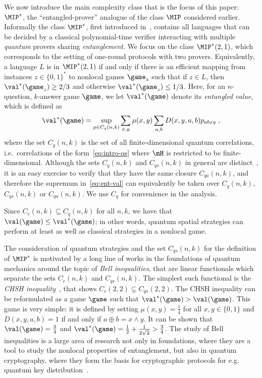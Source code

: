 We now introduce the main complexity class that is the focus of this paper: $\MIP^*$, the  ``entangled-prover'' analogue of the class $\MIP$ considered earlier. Informally the class $\MIP^*$, first introduced in~\cite{cleve2004consequences}, contains all languages that can be decided by a classical polynomial-time verifier interacting with multiple \emph{quantum} provers sharing \emph{entanglement}. We focus on the class $\MIP^*(2,1)$, which corresponds to the setting of one-round protocols with two  provers. Equivalently, a language $L$ is in $\MIP^*(2,1)$ if and only if there is an efficient mapping from instances $z\in\{0,1\}^*$ to nonlocal games $\game_z$ such that if $z \in L$, then $\val^*(\game_z) \geq 2/3$ and otherwise $\val^*(\game_z) \leq 1/3$. Here, for an $n$-question, $k$-answer game $\game$, we let $\val^*(\game)$ denote its \emph{entangled value}, which is defined as
\begin{equation}\label{eq:ent-val}
 \val^*(\game) = \sup_{p\in C_{q}(n,k)} \sum_{x,y} \mu(x,y) \sum_{a,b} D(x,y,a,b) p_{abxy}\;,
\end{equation}
where the set $C_{q}(n,k)$ is the set of all finite-dimensional quantum correlations, i.e.\ correlations of the form~\eqref{eq:intro-qs} where $\mH$ is restricted to be finite-dimensional. Although the sets $C_q(n,k)$ and $C_{qs}(n,k)$ in general are distinct~\cite{coladangelo2018unconditional}, it is an easy exercise to verify that they have the same closure $C_{qa}(n,k)$, and therefore the supremum in~\eqref{eq:ent-val} can equivalently be taken over $C_q(n,k)$, $C_{qs}(n,k)$ or $C_{qa}(n,k)$. We use $C_q$ for convenience in the analysis.


Since $C_c(n,k) \subseteq C_{q}(n,k)$ for all $n,k$, we have that $\val(\game) \leq \val^*(\game)$; in other words, quantum spatial strategies can perform at least as well as classical strategies in a nonlocal game. 



The consideration of quantum strategies and the set $C_{qs}(n,k)$ for the definition of $\MIP^*$ is motivated by a long line of works in the foundations of quantum mechanics around the topic of \emph{Bell inequalities}, that are linear functionals which separate the sets $C_{c}(n,k)$ and $C_{qs}(n,k)$. The simplest such functional is the \emph{CHSH inequality}~\cite{clauser1969proposed}, that shows $C_c(2,2) \subsetneq C_{qs}(2,2)$. The CHSH inequality can be reformulated as a game $\game$ such that $\val^*(\game) > \val(\game)$. This game is very simple: it is defined by setting $\mu(x,y)=\frac{1}{4}$ for all $x,y\in\{0,1\}$ and $D(x,y,a,b)=1$ if and only if $a\oplus b = x\wedge y$. It can be shown that $\val(\game) = \frac{3}{4}$ and $\val^*(\game) = \frac{1}{2} + \frac{1}{2\sqrt{2}} > \frac{3}{4}$. The study of Bell inequalities is a large area of research not only in foundations, where they are a tool to study the nonlocal properties of entanglement, but also in quantum cryptography, where they form the basis for cryptographic protocols for e.g. quantum key distribution~\cite{ekert1991quantum}. 

